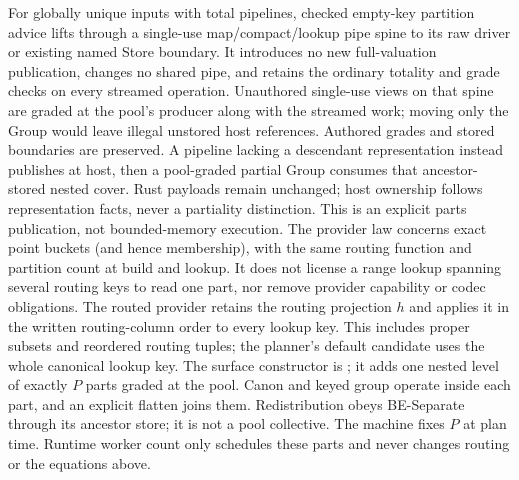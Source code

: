 For globally unique inputs with total pipelines, checked empty-key partition advice lifts
 through a single-use map/compact/lookup pipe spine to its raw
driver or existing named Store boundary. It introduces no new full-valuation
publication, changes no shared pipe, and retains the ordinary totality and
grade checks on every streamed operation.
Unauthored single-use views on that spine are graded at the pool's producer
along with the streamed work; moving only the Group would leave illegal
unstored host references. Authored grades and stored boundaries are preserved.
A pipeline lacking a descendant representation instead publishes
 at host, then a pool-graded partial Group
consumes that ancestor-stored nested cover. Rust payloads remain unchanged;
host ownership follows representation facts, never a partiality distinction.
This is an explicit parts publication, not bounded-memory execution.
The provider law concerns exact point buckets (and hence membership), with
the same routing function and partition count at build and lookup. It does
not license a range lookup spanning several routing keys to read one part,
nor remove provider capability or codec obligations.
The routed provider retains the routing projection $h$ and applies it in
the written routing-column order to every lookup key. This includes
proper subsets and reordered routing tuples; the planner's default
candidate uses the whole canonical lookup key.
The surface constructor is ; it adds one nested
level of exactly $P$ parts graded at the pool. Canon and keyed group operate
inside each part, and an explicit flatten joins them. Redistribution obeys
BE-Separate through its ancestor store; it is not a pool collective.
The machine fixes $P$ at plan time. Runtime worker count only schedules
these parts and never changes routing or the equations above.

